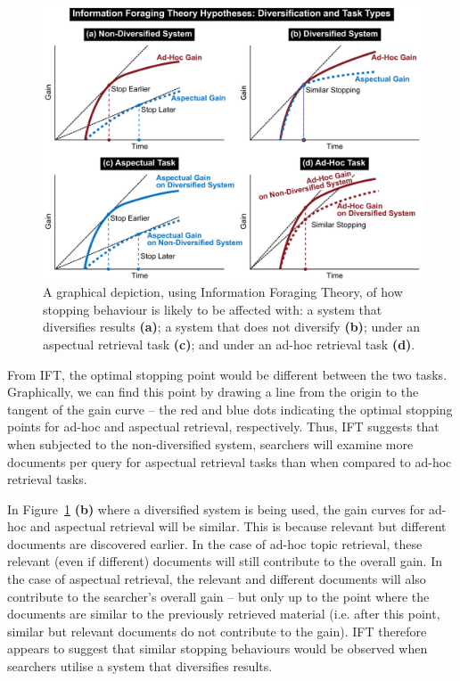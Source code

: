 \begin{figure}[t!]
\begin{center}
        \includegraphics[width=\textwidth]{figures/ift-non-div-fromthesis.pdf}
        \vspace{-2mm}
    \caption{A graphical depiction, using Information Foraging Theory, of how stopping behaviour is likely to be affected with: a system that diversifies results \textbf{(a)}; a system that does not diversify \textbf{(b)}; under an aspectual retrieval task \textbf{(c)}; and under an ad-hoc retrieval task \textbf{(d)}.} \label{fig_ift_patches}    
    \vspace{-6mm}
\end{center}
\end{figure}


From IFT, the optimal stopping point would be different between the two tasks. Graphically, we can find this point by drawing a line from the origin to the tangent of the gain curve -- the red and blue dots indicating the optimal stopping points for ad-hoc and aspectual retrieval, respectively. Thus, IFT suggests that when subjected to the non-diversified system, searchers will examine more documents per query for aspectual retrieval tasks than when compared to ad-hoc retrieval tasks.

In Figure~\ref{fig_ift_patches} \textbf{(b)} where a diversified system is being used, the gain curves for ad-hoc and aspectual retrieval will be similar. This is because relevant but different documents are discovered earlier. In the case of ad-hoc topic retrieval, these relevant (even if different) documents will still contribute to the overall gain. In the case of aspectual retrieval, the relevant and different documents will also contribute to the searcher's overall gain -- but only up to the point where the documents are similar to the previously retrieved material (i.e. after this point, similar but relevant documents do not contribute to the gain). IFT therefore appears to suggest that similar stopping behaviours would be observed when searchers utilise a system that diversifies results.

